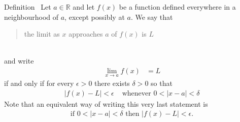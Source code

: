 \begin{frame}[t]
\begin{multicols}{2}









\end{multicols}
\end{frame}


\begin{frame}[t]
\begin{block}{Definition~}
 Let $a \in \mathbb{R}$ and let $f(x)$ be a function defined everywhere in a
neighbourhood of $a$, except possibly at $a$. We say that
\begin{quote}
 the limit as $x$ approaches $a$ of $f(x)$ is $L$
\end{quote}\\
and write
\begin{align*}
  \lim_{x \to a} f(x) &= L
\end{align*}
if and only if for every $\epsilon >0$ there exists $\delta>0$ so that
\begin{align*}
  |f(x) - L| <\epsilon & \text{ whenever } 0<|x-a| < \delta
\end{align*}
Note that an equivalent way of writing this very last statement is
\begin{align*}
  \text{if } 0<|x-a| < \delta \text{ then } |f(x) - L| <\epsilon.
\end{align*}
\end{block}
\end{frame}


